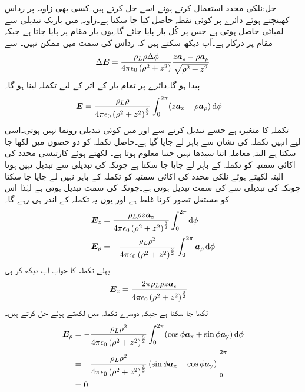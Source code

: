 حل:نلکی محدد استعمال کرتے ہوئے اسے حل کرتے ہیں۔کسی بھی زاویہ پر رداس کھینچتے ہوئے دائرے پر کوئی نقطہ حاصل کیا جا سکتا ہے۔زاویہ میں باریک تبدیلی  سے لمبائی  حاصل ہوتی ہے جس پر کُل بار  پایا جائے گا۔یوں بار  مقام  پر پایا جاتا ہے جبکہ  مقام  پر درکار ہے۔آپ دیکھ سکتے ہیں کہ  رداس کی سمت میں ممکن نہیں۔ سے
\begin{align*}
\Delta {\ensuremath{{\boldsymbol{E}}}}=\frac{\rho_L \rho \Delta \phi}{4\pi\epsilon_0 \left(\rho^2+z^2 \right)} \frac{z{\boldsymbol{a}}_{\textup{z}}-\rho {\boldsymbol{a}}_{\rho}}{\sqrt{\rho^2+z^2}}
\end{align*}
پیدا ہو گا۔دائرے پر تمام بار کے اثر کے لیے تکملہ لینا ہو گا۔
\begin{align*}
\kvec{E}&=\frac{\rho_L \rho}{4\pi\epsilon_0  \left(\rho^2+z^2 \right)^{\frac{3}{2}}}\int_{0}^{2\pi}(z\az-\rho \arho) \dif \phi
\end{align*}
تکملہ کا متغیرہ  ہے جسے تبدیل کرنے سے  اور  میں کوئی تبدیلی رونما نہیں ہوتی۔اسی لیے انہیں تکملہ کی نشان سے باہر لے جایا گیا ہے۔حاصل تکملہ کو دو حصوں میں لکھا جا سکتا ہے البتہ معاملہ اتنا سیدھا نہیں جتنا معلوم ہوتا ہے۔ لکھتے ہوئے کارتیسی محدد کی اکائی سمتیہ  کو تکملہ کے باہر لے جایا جا سکتا ہے چونکہ  کی تبدیلی سے  تبدیل نہیں ہوتا البتہ   لکھتے ہوئے نلکی محدد کی اکائی سمتیہ  کو تکملہ کے باہر نہیں لے جایا جا سکتا چونکہ  کی تبدیلی سے   کی سمت تبدیل ہوتی ہے۔چونکہ  کی سمت تبدیل ہوتی ہے لہٰذا اس کو مستقل تصور کرنا غلط ہے اور یوں یہ تکملہ کے اندر ہی رہے گا۔ 
\begin{gather}
\begin{aligned}
\kvec{E}_z&=\frac{\rho_L \rho z \az}{4\pi\epsilon_0  \left(\rho^2+z^2 \right)^{\frac{3}{2}}}\int_{0}^{2\pi} \dif \phi\\
\kvec{E}_{\rho}&=-\frac{\rho_L \rho^2}{4\pi\epsilon_0  \left(\rho^2+z^2 \right)^{\frac{3}{2}}}\int_{0}^{2\pi} \arho \dif \phi
\end{aligned}
\end{gather}
پہلے تکملہ کا جواب اب دیکھ کر ہی
\begin{align}
{\ensuremath{{\boldsymbol{E}}}}_z&=\frac{2\pi \rho_L \rho z {\boldsymbol{a}}_{\textup{z}}}{4\pi\epsilon_0  \left(\rho^2+z^2 \right)^{\frac{3}{2}}}
\end{align}
لکھا جا سکتا ہے جبکہ دوسرے تکملہ میں  لکھتے ہوئے حل کرتے ہیں۔
\begin{align*}
\kvec{E}_{\rho}&=-\frac{\rho_L \rho^2}{4\pi\epsilon_0  \left(\rho^2+z^2 \right)^{\frac{3}{2}}}\int_{0}^{2\pi} (\cos \phi \ax+\sin \phi \ay) \dif \phi\\
&=-\frac{\rho_L \rho^2}{4\pi\epsilon_0  \left(\rho^2+z^2 \right)^{\frac{3}{2}}} \eval{ (\sin \phi \ax-\cos \phi \ay) }_{0}^{2\pi}\\
&=0
\end{align*}

